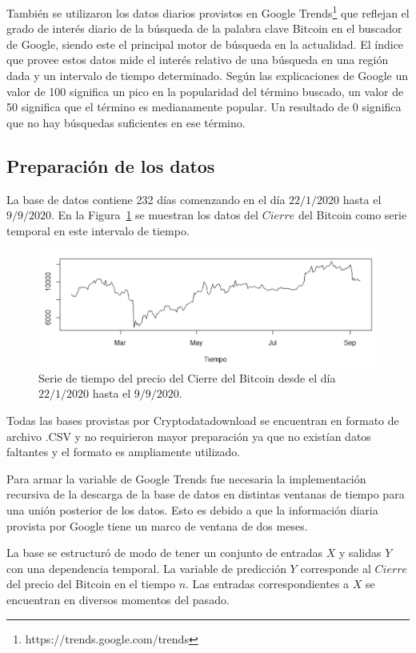\documentclass[a4paper,12pt,twocolumn]{article}
\begin{document}
También se utilizaron los datos diarios provistos en Google Trends\footnote{https://trends.google.com/trends} que reflejan el grado de interés diario de la búsqueda de la palabra clave Bitcoin en el buscador de Google, siendo este el principal motor de búsqueda en la actualidad. El índice que provee estos datos mide el interés relativo de una búsqueda en una región dada y un intervalo de tiempo determinado. Según las explicaciones de Google un valor de 100 significa un pico en la popularidad del término buscado, un valor de 50 significa que el término es medianamente popular. Un resultado de 0 significa que no hay búsquedas suficientes en ese término. 

\subsection{Preparación de los datos}

La base de datos contiene 232 días comenzando en el día $22/1/2020$  hasta el $9/9/2020$. En la Figura~\ref{priceClose} se muestran los datos del $Cierre$ del Bitcoin como serie temporal en este intervalo de tiempo. 

\begin{figure}[!hbt]
\centering
\includegraphics[width=1\textwidth]{priceCloseBitcoin}
\caption{Serie de tiempo del precio del Cierre del Bitcoin desde el día $22/1/2020$  hasta el $9/9/2020$.}
\label{priceClose}
\end{figure}

Todas las bases provistas por Cryptodatadownload se encuentran en formato de archivo .CSV y no requirieron mayor preparación ya que no existían datos faltantes y el formato es ampliamente utilizado. 

Para armar la variable de Google Trends fue necesaria la implementación recursiva de la descarga de la base de datos en distintas ventanas de tiempo para una unión posterior de los datos. Esto es debido a que la información diaria provista por Google tiene un marco de ventana de dos meses. 

La base se estructuró de modo de tener un conjunto de entradas $X$ y salidas $Y$ con una dependencia temporal. La variable de predicción $Y$ corresponde al $Cierre$ del precio del Bitcoin en el tiempo $n$. Las entradas correspondientes a $X$ se encuentran en diversos momentos del pasado. 
\end{document}
